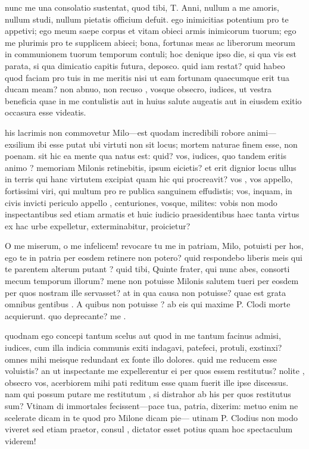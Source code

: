  nunc me una consolatio sustentat, quod tibi, T. Anni, nullum a me amoris, nullum studi, nullum pietatis officium defuit. ego inimicitias potentium pro te appetivi; ego meum saepe corpus et vitam obieci armis inimicorum tuorum; ego me plurimis pro te supplicem abieci; bona, fortunas meas ac liberorum meorum in communionem tuorum temporum contuli; hoc denique ipso die, si qua vis est parata, si qua dimicatio capitis futura, deposco. quid iam restat? quid habeo quod faciam pro tuis in me meritis nisi ut eam fortunam quaecumque erit tua ducam meam? non abnuo, non recuso , vosque obsecro, iudices, ut vestra beneficia quae in me contulistis aut in huius salute augeatis aut in eiusdem exitio occasura esse videatis.

 his lacrimis non commovetur Milo—est quodam incredibili robore animi—exsilium ibi esse putat ubi virtuti non sit locus; mortem naturae finem esse, non poenam. sit hic ea mente qua natus est: quid? vos, iudices, quo tandem eritis animo ? memoriam Milonis retinebitis, ipsum eicietis? et erit dignior locus ullus in terris qui hanc virtutem excipiat quam hic qui procreavit? vos , vos appello, fortissimi viri, qui multum pro re publica sanguinem effudistis; vos, inquam, in civis invicti periculo appello , centuriones, vosque, milites: vobis non modo inspectantibus sed etiam armatis et huic iudicio praesidentibus haec tanta virtus ex hac urbe expelletur, exterminabitur, proicietur?

 O me miserum, o me infelicem! revocare tu me in patriam, Milo, potuisti per hos, ego te in patria per eosdem retinere non potero? quid respondebo liberis meis qui te parentem alterum putant ? quid tibi, Quinte frater, qui nunc abes, consorti mecum temporum illorum? mene non potuisse Milonis salutem tueri per eosdem per quos nostram ille servasset? at in qua causa non potuisse? quae est grata omnibus gentibus . A quibus non potuisse ? ab eis qui maxime P. Clodi morte acquierunt. quo deprecante? me .

 quodnam ego concepi tantum scelus aut quod in me tantum facinus admisi, iudices, cum illa indicia communis exiti indagavi, patefeci, protuli, exstinxi? omnes mihi meisque redundant ex fonte illo dolores. quid me reducem esse voluistis? an ut inspectante me expellerentur ei per quos essem restitutus? nolite , obsecro vos, acerbiorem mihi pati reditum esse quam fuerit ille ipse discessus. nam qui possum putare me restitutum , si distrahor ab his per quos restitutus sum? Vtinam di immortales fecissent—pace tua, patria, dixerim: metuo enim ne scelerate dicam in te quod pro Milone dicam pie— utinam P. Clodius non modo viveret sed etiam praetor, consul , dictator esset potius quam hoc spectaculum viderem!

